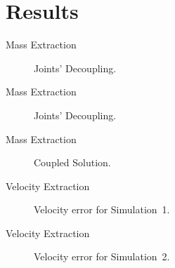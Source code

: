 \section{Results}

\begin{frame}{Mass Extraction}
  \begin{figure}
    \centering
    \subfloat[]{} \quad
    \subfloat[]{}
    \caption{Joints' Decoupling.}
  \end{figure}
\end{frame}

\begin{frame}{Mass Extraction}
  \begin{figure}
    \centering
    \subfloat[]{} \quad
    \subfloat[]{}
    \caption{Joints' Decoupling.}
  \end{figure}
\end{frame}

\begin{frame}{Mass Extraction}
  \begin{figure}
    \centering
    \subfloat[]{} \quad
    \subfloat[]{}
    \caption{Coupled Solution.}
  \end{figure}
\end{frame}

\begin{frame}{Velocity Extraction}
  \begin{figure}
    \centering
    \subfloat[]{} \quad
    \subfloat[]{}
    \caption{Velocity error for Simulation~1.}
  \end{figure}
\end{frame}

\begin{frame}{Velocity Extraction}
  \begin{figure}
    \centering
    \subfloat[]{} \quad
    \subfloat[]{}
    \caption{Velocity error for Simulation~2.}
  \end{figure}
\end{frame}

